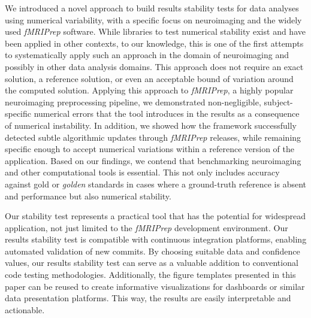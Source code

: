 \documentclass[lettersize,journal]{IEEEtran}
\newcommand{\fmriprep}{\emph{fMRIPrep}\xspace}
\begin{document}
{%

We introduced a novel approach to build results stability tests for data analyses using numerical variability, with a specific focus on neuroimaging and the widely used \fmriprep software. While libraries to test numerical stability exist and have been applied in other contexts, to our knowledge, this is one of the first attempts to systematically apply such an approach in the domain of neuroimaging and possibly in other data analysis domains.
This approach does not require an exact solution, a reference solution, or even an acceptable bound of variation around the computed solution.
Applying this approach to \fmriprep, a highly popular neuroimaging preprocessing pipeline, we demonstrated non-negligible, subject-specific numerical errors that the tool introduces in the results as a consequence of numerical instability.
In addition, we showed how the framework successfully detected subtle algorithmic updates through \fmriprep releases, while remaining specific enough to accept numerical variations within a reference version of the application.
Based on our findings, we contend that benchmarking neuroimaging and other computational tools is essential. This not only includes accuracy against gold or \emph{golden} standards in cases where a ground-truth reference is absent and performance but also numerical stability.

Our stability test represents a practical tool that has the potential for widespread application, not just limited to the \fmriprep development environment. Our results stability test is compatible with continuous integration platforms, enabling automated validation of new commits. By choosing suitable data and confidence values, our results stability test can serve as a valuable addition to conventional code testing methodologies. Additionally, the figure templates presented in this paper can be reused to create informative visualizations for dashboards or similar data presentation platforms. This way, the results are easily interpretable and actionable.

}
\end{document}
